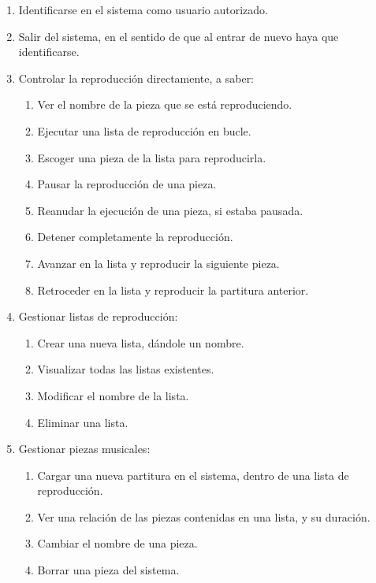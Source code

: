 \begin{enumerate}
	\item Identificarse en el sistema como usuario autorizado.
	\item Salir del sistema, en el sentido de que al entrar de nuevo haya que identificarse.
	\item Controlar la reproducción directamente, a saber:
	
	\begin{enumerate}
		\item Ver el nombre de la pieza que se está reproduciendo.
		\item Ejecutar una lista de reproducción en bucle.
		\item Escoger una pieza de la lista para reproducirla.
		\item Pausar la reproducción de una pieza.
		\item Reanudar la ejecución de una pieza, si estaba pausada.
		\item Detener completamente la reproducción.
		\item Avanzar en la lista y reproducir la siguiente pieza.
		\item Retroceder en la lista y reproducir la partitura anterior.
	\end{enumerate}
	
	\item Gestionar listas de reproducción:
	
	\begin{enumerate}
		\item Crear una nueva lista, dándole un nombre.
		\item Visualizar todas las listas existentes.
		\item Modificar el nombre de la lista.
		\item Eliminar una lista.
	\end{enumerate}
	
	\item Gestionar piezas musicales:
	
	\begin{enumerate}
		\item Cargar una nueva partitura en el sistema, dentro de una lista de reproducción.
		\item Ver una relación de las piezas contenidas en una lista, y su duración.
		\item Cambiar el nombre de una pieza.
		\item Borrar una pieza del sistema.
	\end{enumerate}
	

\end{enumerate}
